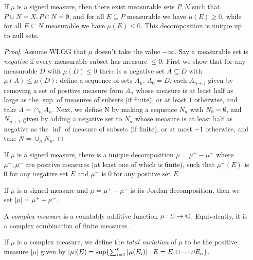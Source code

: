 \documentclass[letterpaper,11pt]{report}
\begin{document}
\begin{thm}\label{hahn-decomposition} If $\mu$ is a signed measure, then there exist measurable sets $P,N$ such that $P\cup N = X, P \cap N = \emptyset$, and for all $E \subseteq P$ measurable we have $\mu(E) \ge 0$, while for all $E \subseteq N$ measurable we have $\mu(E) \le 0$. This decomposition is unique up to null sets.
\end{thm}
\begin{proof} Assume WLOG that $\mu$ doesn't take the value $-\infty$. Say a measurable set is \emph{negative} if every measurable subset has measure $\le 0$. First we show that for any measurable $D$ with $\mu(D) \le 0$ there is a negative set $A \subseteq D$ with $\mu(A) \le \mu(D)$: define a sequence of sets $A_n$, $A_0 = D$, each $A_{n+1}$ given by removing a set of positive measure from $A_n$ whose measure is at least half as large as the $\sup$ of measures of subsets (if finite), or at least $1$ otherwise, and take $A = \cap_n A_n$. Next, we define N by making a sequence $N_n$ with $N_0 = \emptyset$, and $N_{n+1}$ given by adding a negative set to $N_n$ whose measure is at least half as negative as the $\inf$ of measure of subsets (if finite), or at most $-1$ otherwise, and take $N = \cup_n N_n$.
\end{proof}

\begin{thm} If $\mu$ is a signed measure, there is a unique decomposition $\mu = \mu^+ - \mu^-$ where $\mu^+, \mu^-$ are positive measures (at least one of which is finite), such that $\mu^+(E)$ is $0$ for any negative set $E$ and $\mu^-$ is $0$ for any positive set $E$.
\end{thm}

\begin{defn} If $\mu$ is a signed measure and $\mu = \mu^+ - \mu^-$ is its Jordan decomposition, then we set $|\mu| = \mu^+ + \mu^-$.
\end{defn}

\begin{defn} A \emph{complex measure} is a countably additive function $\mu:\Sigma \rightarrow \mathbb{C}$. Equivalently, it is a complex combination of finite measures.
\end{defn}

\begin{defn} If $\mu$ is a complex measure, we define the \emph{total variation} of $\mu$ to be the positive measure $|\mu|$ given by $|\mu|(E) = \sup\{\sum_{i=1}^n |\mu(E_i)| \mid E = E_1 \dotcup \cdots \dotcup E_n\}$.
\end{defn}
\end{document}

